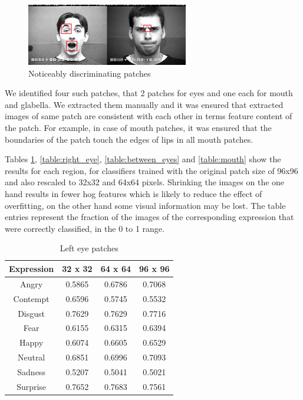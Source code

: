 \begin{figure}
\centering
\includegraphics[width=200pt]{img/manual_patch.png}
  \caption{Noticeably discriminating patches}
  \label{fig:manual_patch}
\end{figure}

We identified four such patches, that 2 patches for eyes and one each for mouth and glabella. We extracted them manually and it was ensured that extracted images of same patch are consistent with each other in terms feature content of the patch. For example, in case of mouth patches, it was ensured that the boundaries of the patch touch the edges of lips in all mouth patches.

Tables \ref{table:left_eye}, \ref{table:right_eye}, \ref{table:between_eyes} and \ref{table:mouth} show the results for each region, for classifiers trained 
with the original patch size of 96x96 and also rescaled to 32x32 and 64x64 pixels. Shrinking the images on the one hand results in fewer hog features which is likely to reduce the effect of overfitting, on the other hand some visual information may be lost. The table entries represent the fraction of the images of the corresponding expression that were correctly classified, in the 0 to 1 range.





\begin{table}
\caption{Left eye patches}
\label{table:left_eye}

\begin{tabular}{| c | c | c | c |}
\hline
Expression & 32 x 32 &  64 x 64  & 96 x 96  \\

\hline
Angry & 0.5865 & 0.6786 & 0.7068 \\
Contempt & 0.6596 &	0.5745 & 0.5532 \\
Disgust	& 0.7629 &	0.7629 &	0.7716 \\
Fear &	0.6155 & 0.6315 & 0.6394 \\ 
Happy &	0.6074 & 0.6605 & 0.6529 \\ 
Neutral & 0.6851 &	0.6996 & 0.7093 \\
Sadness & 0.5207 & 0.5041 &	0.5021 \\
Surprise & 0.7652 &	0.7683 & 0.7561 \\

\hline
\end{tabular}
\end{table}

